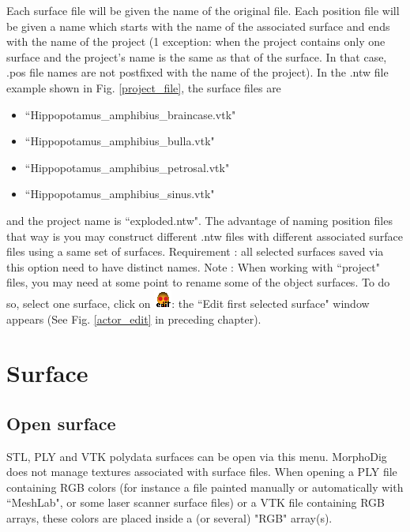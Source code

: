 Each surface file will be given the name of the original file. Each position file will be given a name which starts with the name of the associated surface and ends with the name of the project (1 exception: when the project contains only one surface and  the project's name is the same as that of the surface. In that case, .pos file names are not postfixed with the name of the project). In the .ntw file example shown in Fig. \ref{project_file}, the surface files are 
\begin{itemize}
\item ``Hippopotamus\_amphibius\_braincase.vtk" 
\item ``Hippopotamus\_amphibius\_bulla.vtk" 
\item ``Hippopotamus\_amphibius\_petrosal.vtk" 
\item ``Hippopotamus\_amphibius\_sinus.vtk" 
\end{itemize}
\noindent and the project name is ``exploded.ntw". The advantage of naming position files that way is you may construct different .ntw files with different associated surface files using a same set of surfaces. Requirement : all selected surfaces saved via this option
need to have distinct names. Note : When working with ``project" files, you may need at
some point to rename some of the object surfaces. To do so, select one surface, click on \includegraphics[scale=0.7]{images/06/objects/actor_edit.png}: the ``Edit first selected surface" window appears (See Fig. \ref{actor_edit} in preceding chapter).




\section{Surface}
\subsection{Open surface}
STL, PLY and VTK polydata surfaces can be open via this menu. MorphoDig does not manage textures associated with surface files. When opening a PLY file containing RGB colors (for instance a file painted manually or automatically with ``MeshLab", or some laser scanner surface files) or a VTK file containing RGB arrays, these colors are placed inside a (or several) "RGB" array(s). 


